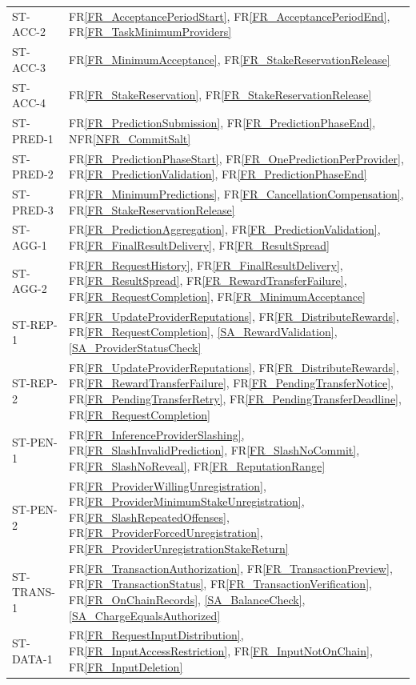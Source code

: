 \documentclass[12pt]{article}
\newcommand{\rref}[1]{FR\ref{#1}}
\newcommand{\nfrref}[1]{NFR\ref{#1}}
\newcommand{\saref}[1]{\ref{#1}}
\begin{document}
\begin{longtable}{p{} p{}}
ST-ACC-2 & \rref{FR_AcceptancePeriodStart}, \rref{FR_AcceptancePeriodEnd}, \rref{FR_TaskMinimumProviders}\\
ST-ACC-3 & \rref{FR_MinimumAcceptance}, \rref{FR_StakeReservationRelease}\\
ST-ACC-4 & \rref{FR_StakeReservation}, \rref{FR_StakeReservationRelease}\\
ST-PRED-1 & \rref{FR_PredictionSubmission}, \rref{FR_PredictionPhaseEnd}, \nfrref{NFR_CommitSalt}\\
ST-PRED-2 & \rref{FR_PredictionPhaseStart}, \rref{FR_OnePredictionPerProvider}, \rref{FR_PredictionValidation}, \rref{FR_PredictionPhaseEnd}\\
ST-PRED-3 & \rref{FR_MinimumPredictions}, \rref{FR_CancellationCompensation}, \rref{FR_StakeReservationRelease}\\
ST-AGG-1 & \rref{FR_PredictionAggregation}, \rref{FR_PredictionValidation}, \rref{FR_FinalResultDelivery}, \rref{FR_ResultSpread}\\
ST-AGG-2 & \rref{FR_RequestHistory}, \rref{FR_FinalResultDelivery}, \rref{FR_ResultSpread}, \rref{FR_RewardTransferFailure}, \rref{FR_RequestCompletion}, \rref{FR_MinimumAcceptance}\\
ST-REP-1 & \rref{FR_UpdateProviderReputations}, \rref{FR_DistributeRewards}, \rref{FR_RequestCompletion}, \saref{SA_RewardValidation}, \saref{SA_ProviderStatusCheck}\\
ST-REP-2 & \rref{FR_UpdateProviderReputations}, \rref{FR_DistributeRewards}, \rref{FR_RewardTransferFailure}, \rref{FR_PendingTransferNotice}, \rref{FR_PendingTransferRetry}, \rref{FR_PendingTransferDeadline}, \rref{FR_RequestCompletion}\\
ST-PEN-1 & \rref{FR_InferenceProviderSlashing}, \rref{FR_SlashInvalidPrediction}, \rref{FR_SlashNoCommit}, \rref{FR_SlashNoReveal}, \rref{FR_ReputationRange}\\
ST-PEN-2 & \rref{FR_ProviderWillingUnregistration}, \rref{FR_ProviderMinimumStakeUnregistration}, \rref{FR_SlashRepeatedOffenses}, \rref{FR_ProviderForcedUnregistration}, \rref{FR_ProviderUnregistrationStakeReturn}\\
ST-TRANS-1 & \rref{FR_TransactionAuthorization}, \rref{FR_TransactionPreview}, \rref{FR_TransactionStatus}, \rref{FR_TransactionVerification}, \rref{FR_OnChainRecords}, \saref{SA_BalanceCheck}, \saref{SA_ChargeEqualsAuthorized}\\
ST-DATA-1 & \rref{FR_RequestInputDistribution}, \rref{FR_InputAccessRestriction}, \rref{FR_InputNotOnChain}, \rref{FR_InputDeletion}\\

\end{longtable}
\end{document}
